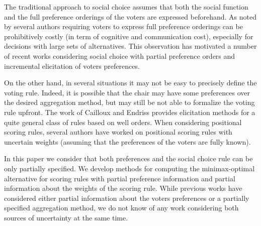 \documentclass[12pt]{article}
\begin{document}
The traditional approach to social choice assumes that both the social function and the full preference orderings of the voters are expressed beforehand. 
As noted by several authors requiring voters to express full preference orderings can be prohibitively costly (in term of cognitive and communication cost), especially for decisions with large sets of alternatives.
This observation has motivated a number of recent works considering social choice with partial preference orders  \cite{Xia2008,Pini2009,Konczak05} and incremental elicitation \cite{Kalech2011,Lu2011,Naamani-Dery2015} of voters preferences. 

On the other hand, in several situations it may not be easy to precisely define the voting rule.
Indeed, it is possible that the chair may have some preferences over the desired aggregation method, but may still be not able to formalize the voting rule upfront.
The work of Cailloux and Endriss \cite{Cailloux2014} provides elicitation methods  for a quite general class of rules based on well orders.
When considering positional scoring rules, several authors \cite{Stein1994,Llamazares2013,Viappiani2018} have worked on  positional scoring rules with uncertain weights (assuming that the preferences of the voters are fully known).

In this paper we consider that both preferences and the social choice rule can be only partially specified.
We develop methods for computing the minimax-optimal alternative for scoring rules with partial preference information and partial information about the weights of the scoring rule.
While previous works have considered either partial information about the voters preferences or a partially specified aggregation method, we do not know of any work considering both sources of uncertainty at the same time.

\end{document}
